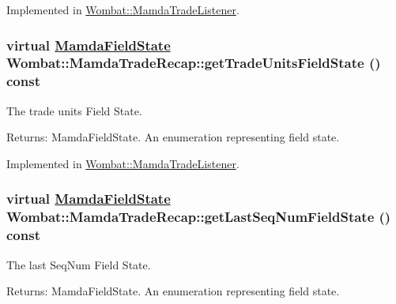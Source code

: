 Implemented in \hyperlink{classWombat_1_1MamdaTradeListener_b14aa9b55ac04672085cd7135cb5868c}{Wombat::Mamda\-Trade\-Listener}.\hypertarget{classWombat_1_1MamdaTradeRecap_76b2a0d55943b5bae38766f11bcc400e}{
\subsubsection[getTradeUnitsFieldState]{\setlength{\rightskip}{0pt plus 5cm}virtual \hyperlink{namespaceWombat_93aac974f2ab713554fd12a1fa3b7d2a}{Mamda\-Field\-State} Wombat::Mamda\-Trade\-Recap::get\-Trade\-Units\-Field\-State () const}}
\label{classWombat_1_1MamdaTradeRecap_76b2a0d55943b5bae38766f11bcc400e}


The trade units Field State. 

\begin{Desc}
\item[Returns:]Mamda\-Field\-State. An enumeration representing field state. \end{Desc}


Implemented in \hyperlink{classWombat_1_1MamdaTradeListener_9c8d5e8e3f9aca07499877ea4b27c765}{Wombat::Mamda\-Trade\-Listener}.\hypertarget{classWombat_1_1MamdaTradeRecap_97b6fab4e918ee8397fe7586b9d710c2}{
\subsubsection[getLastSeqNumFieldState]{\setlength{\rightskip}{0pt plus 5cm}virtual \hyperlink{namespaceWombat_93aac974f2ab713554fd12a1fa3b7d2a}{Mamda\-Field\-State} Wombat::Mamda\-Trade\-Recap::get\-Last\-Seq\-Num\-Field\-State () const}}
\label{classWombat_1_1MamdaTradeRecap_97b6fab4e918ee8397fe7586b9d710c2}


The last Seq\-Num Field State. 

\begin{Desc}
\item[Returns:]Mamda\-Field\-State. An enumeration representing field state. \end{Desc}


